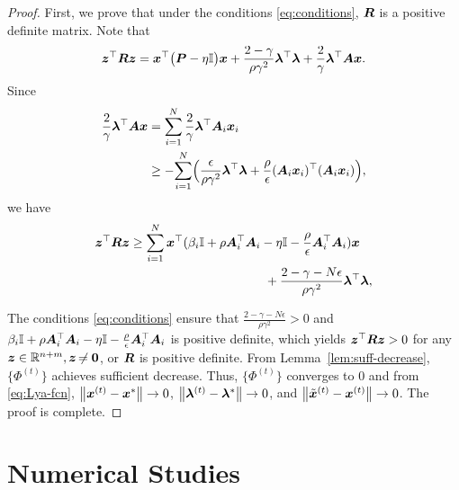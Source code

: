 \documentclass[twocolumn,amsthm]{autart}%
\theoremstyle{definition}
\theoremstyle{plain}
\begin{document}
\begin{proof}
First, we prove that under the conditions \eqref{eq:conditions}, $\boldsymbol{R}$ is a positive definite matrix.
Note that 
\begin{equation}
\boldsymbol{z}^\top \boldsymbol{R} \boldsymbol{z} = 
\boldsymbol{x}^\top \big(\boldsymbol{P} - \eta \mathbb{I} \big) \boldsymbol{x} 
+ \frac{2-\gamma}{\rho \gamma^2} \boldsymbol{\lambda}^\top \boldsymbol{\lambda} 
+ \frac{2}{\gamma} \boldsymbol{\lambda}^\top \boldsymbol{A} \boldsymbol{x}.
\end{equation}
Since 
\begin{equation}
\begin{split}
\frac{2}{\gamma} \boldsymbol{\lambda}^\top \boldsymbol{A} \boldsymbol{x} 
&= \sum_{i=1}^N \frac{2}{\gamma} \boldsymbol{\lambda}^\top \boldsymbol{A}_i \boldsymbol{x}_i \\
& \ge - \! \sum_{i=1}^N \! \Big( \frac{\epsilon}{\rho \gamma^2} \boldsymbol{\lambda}^\top \boldsymbol{\lambda} 
+ \frac{\rho}{\epsilon} (\boldsymbol{A}_i \boldsymbol{x}_i)^\top (\boldsymbol{A}_i \boldsymbol{x}_i) \Big),
\end{split}
\end{equation}
we have 
\begin{equation}
\begin{multlined}
\bbsym{z}^\top \bbsym{R} \bbsym{z}
\ge \sum_{i=1}^N \bbsym{x}^\top (\beta_i \II + \rho \bbsym{A}_i^\top \bbsym{A}_i - \eta \II - \frac{\rho}{\epsilon} \bbsym{A}_i^\top \bbsym{A}_i) \bbsym{x} \\
+ \frac{2 - \gamma - N \epsilon}{\rho \gamma^2} \bbsym{\lambda}^\top \bbsym{\lambda},
\end{multlined}
\end{equation}

The conditions \eqref{eq:conditions} ensure that $\frac{2 - \gamma - N \epsilon}{\rho \gamma^2} > 0$ and $\beta_i \mathbb{I} + \rho \boldsymbol{A}_i^\top \boldsymbol{A}_i - \eta \mathbb{I} - \frac{\rho}{\epsilon} \boldsymbol{A}_i^\top \boldsymbol{A}_i$ is positive definite, which yields $\boldsymbol{z}^\top \boldsymbol{R} \boldsymbol{z} > 0$ for any $\boldsymbol{z} \in \mathbb{R}^{n+m}, \boldsymbol{z}\not\nobreak\mkern -2mu = \boldsymbol{0}$, or $\boldsymbol{R}$ is positive definite.
From Lemma~\ref{lem:suff-decrease}, $\{\Phi^{(t)}\}$ achieves sufficient decrease.
Thus, $\{\Phi^{(t)}\}$ converges to $0$ and from \eqref{eq:Lya-fcn}, $\left\lVert \boldsymbol{x}^{(t)}-\boldsymbol{x}^{*} \right\rVert \rightarrow 0$, $\left\lVert \boldsymbol{\lambda}^{(t)}-\boldsymbol{\lambda}^{*} \right\rVert \rightarrow 0$, and $\left\lVert \Tilde{\boldsymbol{x}}^{(t)} - \boldsymbol{x}^{(t)} \right\rVert \rightarrow 0$. The proof is complete.
\end{proof}

\section{Numerical Studies}
\end{document}
